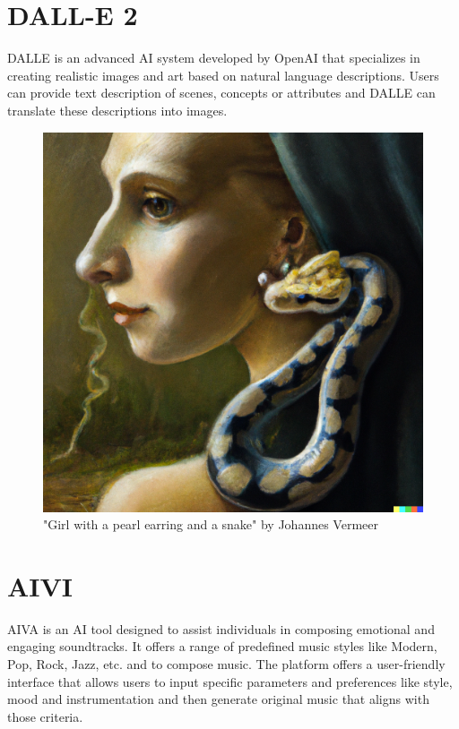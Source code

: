 \documentclass[
]{book}
\begin{document}
\hypertarget{dall-e-2}{%
\section{DALL-E 2}\label{dall-e-2}}

DALLE is an advanced AI system developed by OpenAI that specializes in creating realistic images and art based on natural language descriptions. Users can provide text description of scenes, concepts or attributes and DALLE can translate these descriptions into images.

\begin{figure}

{\centering \includegraphics[width=0.7\linewidth]{Girl_with_a_pearlearrring_a_snake} 

}

\caption{"Girl with a pearl earring and a snake" by Johannes Vermeer}\label{fig:unnamed-chunk-11}
\end{figure}

\hypertarget{aivi}{%
\section{AIVI}\label{aivi}}

AIVA is an AI tool designed to assist individuals in composing emotional and engaging soundtracks. It offers a range of predefined music styles like Modern, Pop, Rock, Jazz, etc. and to compose music. The platform offers a user-friendly interface that allows users to input specific parameters and preferences like style, mood and instrumentation and then generate original music that aligns with those criteria.
\end{document}
